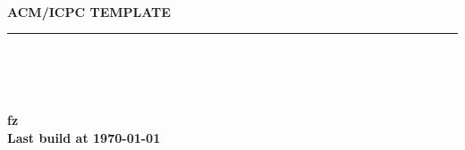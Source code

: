 \begin{titlepage}
    \pagestyle{empty}
    
  \begin{center}
        ~\\[80pt]
    \fontsize{40pt}{\baselineskip}\selectfont  \textsc{\textbf{ACM/ICPC TEMPLATE}}\\[32pt]
    \rule{\textwidth}{2pt}\ \\[8pt]
    ~\\[20pt]
    \begin{figure}[!h]
        \centering
        \def\svgwidth{320pt}
        
    \end{figure}

    ~\\[20pt]
    \Huge\textbf{fz}\\[14pt]
    \Large\textbf{Last build at \today}
  \end{center}
\end{titlepage}
\restoregeometry

